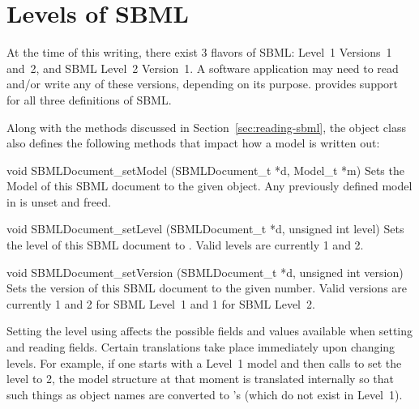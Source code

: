 \documentclass{sbmlmanual}
\begin{document}
\section{Levels of SBML}
\label{sec:sbml-levels}

At the time of this writing, there exist 3 flavors of SBML: Level~1
Versions~1 and~2, and SBML Level~2 Version~1.  A software application may
need to read and/or write any of these versions, depending on its purpose.
\libsbml{} provides support for all three definitions of SBML.

Along with the methods discussed in Section~\ref{sec:reading-sbml}, the
 object class also defines the following methods
that impact how a model is written out:


\begin{methoddef}{void SBMLDocument\_setModel (SBMLDocument\_t *d, Model\_t *m)}
  Sets the Model of this SBML document to the given  object.
  Any previously defined model in  is unset and freed.
\end{methoddef}


\begin{methoddef}{void SBMLDocument\_setLevel (SBMLDocument\_t *d, unsigned int level)}
  Sets the level of this SBML document to .  Valid levels
  are currently 1 and 2. 
\end{methoddef}


\begin{methoddef}{void SBMLDocument\_setVersion (SBMLDocument\_t *d, unsigned int version)}
  Sets the version of this SBML document to the given 
  number.  Valid versions are currently 1 and 2 for SBML Level~1 and 1 for SBML
  Level~2.
\end{methoddef}


Setting the level using  affects the
possible fields and values available when setting and reading fields.
Certain translations take place immediately upon changing levels.  For
example, if one starts with a Level~1 model and then calls
 to set the level to 2, the model
structure at that moment is translated internally so that such things as
object names are converted to 's (which do not exist in
Level~1).
\end{document}
